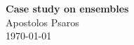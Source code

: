 


\usepackage{subcaption}

\usepackage[english]{babel}
\usepackage{blindtext}


	
	\sloppy
	
	\begin{center}	
		\Large
		\textbf{Case study on ensembles}\\
		\large
		Apostolos Psaros\\	
		\today
	\end{center}
	\vskip 0.5in
	
